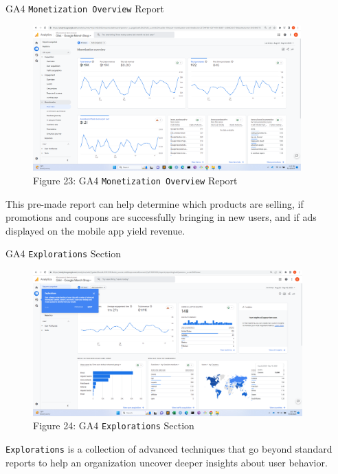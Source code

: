 \documentclass[pdf]{beamer}
\theoremstyle{remark}
\theoremstyle{definition}
\begin{document}
\begin{frame}[t]{GA4 \texttt{Monetization Overview} Report}
\begin{figure}[htbp]
  \captionsetup{justification=centering}
  \includegraphics[height=5.6cm, trim=1.5cm 0.0cm 2.0cm 0.0cm width=5.6cm]{Images/G4A_8c_091923_Monetization_Overview.png}
  \caption{Figure {\color{franklinblue} 23}: GA4 \texttt{Monetization Overview} Report}
\end{figure}
\vspace{-2.0ex}
\small 
This pre-made report can help determine which products are selling, if promotions and coupons are successfully bringing in new users, and if ads displayed on the mobile app yield revenue.
\end{frame}

\begin{frame}[t]{GA4 \texttt{Explorations} Section}
\begin{figure}[htbp]
  \captionsetup{justification=centering}
  \includegraphics[height=5.6cm, trim=1.5cm 0.0cm 2.0cm 0.0cm width=5.6cm]{Images/G4A_6d_091923_Explorations.png}
  \caption{Figure {\color{franklinblue} 24}: GA4 \texttt{Explorations} Section}
\end{figure}
\vspace{-2.0ex}
\small 
\texttt{Explorations} is a collection of advanced techniques that go beyond standard reports to help an organization uncover deeper insights about user behavior.
\end{frame}
\end{document}
